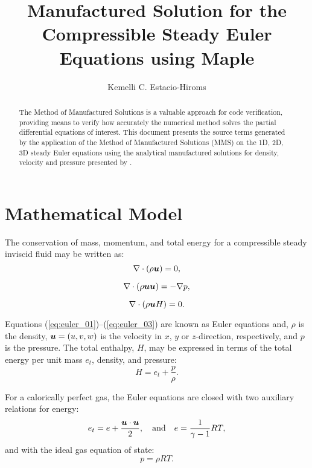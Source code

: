 \documentclass[10pt]{article}
\title{Manufactured Solution for the Compressible Steady Euler Equations using Maple}
\author{Kemelli C. Estacio-Hiroms}
\newcommand{\bv}[1]{\ensuremath{\mbox{\boldmath$ #1 $}}}
\begin{document}
\maketitle

\begin{abstract}
The Method of Manufactured Solutions is a valuable approach for code verification, providing means to verify how accurately the numerical method solves the partial differential equations of interest.
This document presents the source terms generated by the application of the Method of Manufactured Solutions (MMS) on the 1D, 2D, 3D steady Euler equations using the analytical manufactured solutions for density, velocity and pressure presented by \citet{Roy2002}.
\end{abstract}





\section{Mathematical Model}
The conservation of mass, momentum, and total energy for a compressible steady inviscid fluid may be written as:
\begin{equation}
 \label{eq:euler_01}
\nabla \cdot \left(\rho \bv{u}\right) = 0,
\end{equation}

\begin{equation}
 \label{eq:euler_02}
\nabla\cdot\left(\rho\bv{u}\bv{u}\right) = -\nabla p,
\end{equation}

\begin{equation}
 \label{eq:euler_03}
\nabla\cdot\left(\rho \bv{u} H\right) = 0.
\end{equation}


Equations (\ref{eq:euler_01})--(\ref{eq:euler_03}) are known as Euler equations and, $\rho$ is the density, $\bv{u}=(u,v,w)$ is the velocity in $x$, $y$ or $z$-direction, respectively,    and $p$ is the pressure. The total enthalpy, $H$, may be expressed in terms of the total energy per unit mass $e_t$, density, and pressure:
$$H = e_t + \dfrac{p}{\rho}.$$

For a calorically perfect gas, the Euler equations are closed with two auxiliary relations for energy:
\begin{equation}
 \label{eq:euler_04}
e_t= e+\dfrac{\bv{u}\cdot \bv{u}}{2},\quad\mbox{and}\quad e=\dfrac{1}{\gamma -1}RT ,
\end{equation}
and with the ideal gas equation of state:
\begin{equation}
 \label{eq:euler_05}
p=\rho RT.
\end{equation}
\end{document}
